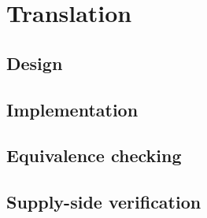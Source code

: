 \chapter{Translation}
\label{ch:translation} %


\section{Design}
\label{sec:translation-design} %


\section{Implementation}
\label{sec:translation-implementation} %

\section{Equivalence checking}
\label{sec:equivalence-checking} %

\section{Supply-side verification}
\label{sec:translation-supply-side-verification} %
